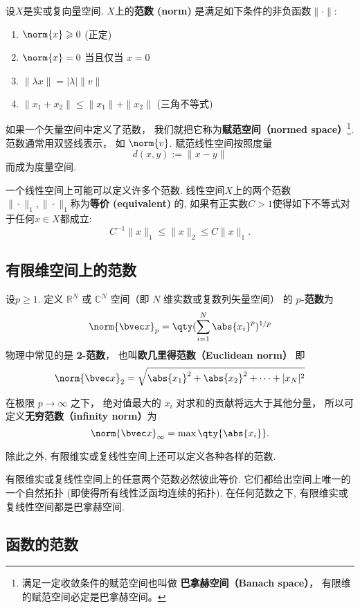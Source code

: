 

设$X$是实或复向量空间. $X$上的\textbf{范数 (norm)} 是满足如下条件的非负函数$\|\cdot\|$:
\begin{enumerate}
\item $\norm{x} \geqslant 0$ (正定)
\item $\norm{x} = 0$ 当且仅当 $x = 0$
\item $\|\lambda x\| = |\lambda|\| v\|$
\item $\|x_1+x_2\| \leqslant \|x_1\|+ \|x_2\|$ (三角不等式)
\end{enumerate}

如果一个矢量空间中定义了范数， 我们就把它称为\textbf{赋范空间（normed space）}\footnote{满足一定收敛条件的赋范空间也叫做 \textbf{巴拿赫空间（Banach space）}， 有限维的赋范空间必定是巴拿赫空间。%
}. 范数通常用双竖线表示， 如 $\norm{v}$. 赋范线性空间按照度量
$$
d(x,y):=\|x-y\|
$$
而成为度量空间. 

一个线性空间上可能可以定义许多个范数. 线性空间$X$上的两个范数$\|\cdot\|_1,\|\cdot\|_1$称为\textbf{等价 (equivalent)} 的, 如果有正实数$C>1$使得如下不等式对于任何$x\in X$都成立:
$$
C^{-1}\|x\|_{1}\leq\|x\|_2\leq C\|x\|_1.
$$

\subsection{有限维空间上的范数}
设$p\geq1$. 定义 $\mathbb R^N$ 或 $\mathbb C^N$ 空间（即 $N$ 维实数或复数列矢量空间） 的 \textbf{$p$-范数}为
\begin{equation}
\norm{\bvec x}_p = \qty(\sum_{i=1}^N \abs{x_i}^p)^{1/p}
\end{equation}
物理中常见的是 \textbf{2-范数}， 也叫\textbf{欧几里得范数（Euclidean norm）} 即
\begin{equation}
\norm{\bvec x}_2 = \sqrt{\abs{x_1}^2 + \abs{x_2}^2 + \dots+|x_N|^2}
\end{equation}

在极限 $p \to \infty$ 之下， 绝对值最大的 $x_i$ 对求和的贡献将远大于其他分量， 所以可定义\textbf{无穷范数（infinity norm）}为
\begin{equation}
\norm{\bvec x}_\infty = \max \qty{\abs{x_i}}.
\end{equation}

除此之外, 有限维实或复线性空间上还可以定义各种各样的范数.

有限维实或复线性空间上的任意两个范数必然彼此等价. 它们都给出空间上唯一的一个自然拓扑 (即使得所有线性泛函均连续的拓扑). 在任何范数之下, 有限维实或复线性空间都是巴拿赫空间.

\subsection{函数的范数}

